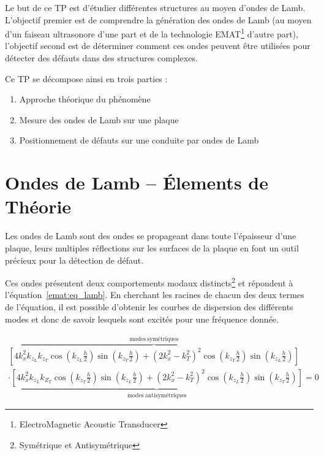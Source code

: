 Le but de ce TP est d'étudier différentes structures au moyen d'ondes de Lamb.
L'objectif premier est de comprendre la génération des ondes de Lamb (au moyen d'un
faiseau ultrasonore d'une part et de la technologie EMAT\footnote{ElectroMagnetic Acoustic
Transducer} d'autre part), l'objectif second est de déterminer comment ces ondes peuvent être utilisées pour détecter des défauts dans des structures complexes.

Ce TP se décompose ainsi en trois parties :
\begin{enumerate}
    \item Approche théorique du phénomène
    \item Mesure des ondes de Lamb sur une plaque
    \item Positionnement de défauts sur une conduite par ondes de Lamb
\end{enumerate}

\section{Ondes de Lamb -- Élements de Théorie}

Les ondes de Lamb sont des ondes se propageant dans toute l'épaisseur d'une plaque, leurs multiples réflections sur les surfaces de la plaque en font un outil précieux pour la détection de défaut.

Ces ondes présentent deux comportements modaux distincts\footnote{Symétrique et Antisymétrique} et répondent à l'équation~\eqref{emat:eq_lamb}.
En cherchant les racines de chacun des deux termes de l'équation, il est possible d'obtenir les courbes de dispersion des différents modes et donc de savoir lesquels sont excités pour une fréquence donnée.

\begin{floatEq}
    \begin{equation}
        \begin{array}{c}
        \overbrace{
        \left[4k_x^2k_{z_L}k_{z_T}\cos\left( k_{z_L}\frac{h}{2}\right)\sin\left(k_{z_T}\frac{h}{2}\right) +\left( 2k_x^2-k_T^2\right) ^2\cos\left( k_{z_T}\frac{h}{2}\right)\sin\left( k_{z_L}\frac{h}{2}\right) \right]}^{\mathrm{modes~symétriques}}\\
        \cdot\underbrace{\left[4k_x^2k_{z_L}k_{Z_T}\cos\left( k_{z_T}\frac{h}{2}\right) \sin\left( k_{z_L}\frac{h}{2}\right) +\left( 2k_x^2-k_T^2\right) ^2\cos\left( k_{z_L}\frac{h}{2}\right) \sin\left( k_{z_T}\frac{h}{2}\right) \right]}_{\mathrm{modes~antisymétriques}}=0
        \end{array}
        \label{emat:eq_lamb}
    \end{equation}
\end{floatEq}

